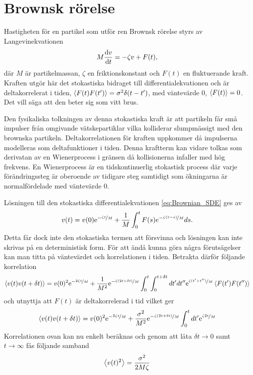\section{Brownsk rörelse}\label{sec:brown}
Hastigheten för en partikel som utför ren Brownsk rörelse styrs av
Langevinekvationen~\cite{Mazo_Brownian2002} 
\begin{equation} \label{eq:Brownian_SDE}
    M\dv{v}{t}=-\zeta v + F(t),
\end{equation}
där $M$ är partikelmassan, $\zeta$ en friktionskonstant och $F(t)$ en
fluktuerande kraft. Kraften utgör här det stokastiska bidraget till
differentialekvationen och är deltakorrelerat i tiden,
$\ev{F(t)F(t')}=\sigma^2\delta(t-t')$, 
med väntevärde 0, $\ev{F(t)}=0$. 
Det vill säga att den beter sig som vitt brus. 

Den fysikaliska tolkningen av denna stokastiska kraft är att partikeln
får små impulser från omgivande vätskepartiklar vilka kolliderar
slumpmässigt med den brownska partikeln.  Deltakorrelationen för
kraften uppkommer då impulserna modelleras som deltafunktioner i
tiden. Denna kraftterm kan vidare tolkas som derivatan av en
Wienerprocess i gränsen då kollisionerna infaller med hög frekvens. En
Wienerprocess är en tidskontinuerlig stokastisk process där varje
förändringssteg är oberoende av tidigare steg samtidigt som
ökningarna är normalfördelade med
väntevärde 0.

Lösningen till den stokastiska differentialekvationen \eqref{eq:Brownian_SDE} ges av 
\begin{equation}
    v(t)=v(0)\mathrm{e}^{-\nicefrac{\zeta t}{M}}+\frac{1}{M}\int^t_0 F(s)e^{-\nicefrac{\zeta (t-s)}{M}}ds.
\end{equation}
Detta får dock inte den stokastiska termen att försvinna och lösningen kan inte skrivas på en deterministisk form. För att ändå kunna göra några förutsägelser kan man titta på väntevärdet och korrelationen i tiden. Betrakta därför följande korrelation 
\begin{equation}
    \ev{v(t)v(t+\delta t)} = v(0)^2\ee^{-\nicefrac{2\zeta t}{M}}+\frac{1}{M^2}\ee^{-\nicefrac{\zeta (2t+\delta t)}{M}}\int_0^t\int_0^{t+\delta t}dt'dt''\ee^{\nicefrac{\zeta (t'+t'')}{M}}\ev{F(t')F(t'')}
\end{equation}
och utnyttja att $F(t)$ är deltakorrelerad i tid vilket ger 
\begin{equation}
    \ev{v(t)v(t+\delta t)} = v(0)^2\ee^{-\nicefrac{2\zeta t}{M}}+\frac{\sigma^2}{M^2}\ee^{-\nicefrac{\zeta (2t+\delta t)}{M}}\int_0^tdt'\ee^{\nicefrac{\zeta 2t}{M}}
\end{equation}
Korrelationen ovan kan nu enkelt beräknas och genom att låta $\delta t\to 0$ samt $t\to \infty$ fås följande samband
\begin{equation}
    \ev{v(t)^2} = \frac{\sigma^2}{2M\zeta}
\end{equation}


